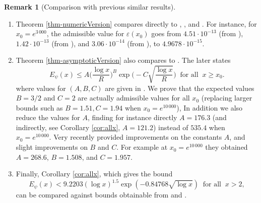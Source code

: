 \documentclass[10pt]{amsart}
\theoremstyle{definition}
\newtheorem{Rem}[prop]{Remark}
\numberwithin{equation}{section}
\begin{document}
\begin{Rem}[Comparison with previous similar results]
\begin{enumerate}
Additionally, in Table \ref{table:NSigmaOptTable} we re-calculate the bounds from \cite[Theorem 1.1]{KLN18}, again using $0.77$ taking this correction into account.
Given the existence of the preprint \cite{HPY22} we have also included in Table \ref{table:NSigmaOptTable} the results one would obtain using $0.618$. 
Finally, we note that if and when the $0.618$ value is confirmed the results of Corollary \ref{cor:allx} will improve to
\[ 
E_{\psi}(x)   <  8.99284(\log x)^{3/2}\exp(-0.8476836\sqrt{\log x})\ \text{ for all }\ x>2. \]
We note that recent work \cite{PaYa23} by Patel and Yang offers a significant asymptotic improvement to the sub-convexity bound: $|\zeta(1/2+it)|\le 66.7t^{\frac{27}{164}}$ for all $t\ge 3$. This could further improve zero density results using the methods of \cite{KLN18}. Implementing such improvements is a project in progress.
\item
Theorem \ref{thm-numericVersion} compares directly to \cite[Theorem 1, Table 1]{PlaTru21ET},  \cite[Theorem 1.5, Table 1]{CulJoh21}, and \cite[Theorem 1.1, Table 1]{JohYan22}.
For instance, for $x_0=e^{3\,000}$, the admissible value for $\varepsilon(x_0)$ goes from $4.51 \cdot 10^{-13}$ (from \cite{PlaTru21ET}), $1.42 \cdot 10^{-13}$ (from \cite{CulJoh21}), and $3.06 \cdot 10^{-14}$ (from \cite{JohYan22}), to $ 4.9678  \cdot 10^{-15}$.
\item
Theorem \ref{thm-asymptoticVersion} also compares to 
\cite[Theorem 1]{PlaTru21ET}. The later states 
\begin{equation*}
E_{\psi}(x)  \le  A \Big( \frac{\log x}{R}\Big)^{B} \exp\Big( -C \sqrt{\frac{\log x}{R}}\Big) \ \text{ for all }\ x \ge x_0.
\end{equation*}
where values for $(A,B,C)$ are given in \cite[Table 1]{PlaTru21ET}.
We prove that the expected values $B=3/2$ and $C=2$ are actually admissible values for all $x_0$ (replacing larger bounds such as $B=1.51, C=1.94$ when $x_0=e^{10\,000}$),
In addition we also reduce the values for $A$, finding for instance directly $A=176.3$ (and indirectly, see Corollary \ref{cor:allx}, $A=121.2$) instead of $535.4$ when $x_0=e^{10\,000}$.
Very recently \cite[Table 1]{CulJoh21} provided improvements on the constants $A$, and slight improvements on $B$ and $C$.
For example at $x_0=e^{10\,000}$ they obtained $A=268.6$,  $B=1.508$, and $C=1.957$.
\item
Finally, Corollary \ref{cor:allx}, which gives the bound 
\[
E_{\psi}(x)   < 9.2203 (\log x)^{1.5}\exp(-0.84768\sqrt{\log x}) \ \text{ for all }\ x>2,
\] can be compared against bounds obtainable from \cite{PlaTru21ET} and \cite{CulJoh21}.

\end{enumerate}
\end{Rem}
\end{document}
